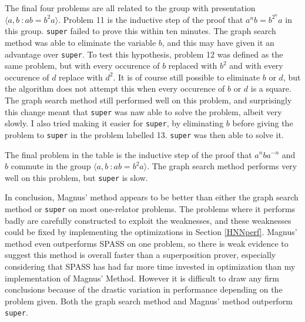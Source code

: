 \documentclass[12pt]{article} %
\theoremstyle{definition}
\theoremstyle{definition}
\theoremstyle{definition}
\theoremstyle{definition}
\begin{document}
The final four problems are all related to the group with presentation
$\langle a, b \ : ab = b^2a\rangle$. Problem 11 is the inductive step
of the proof that $a^nb = b^{2^n}a$ in this group. \lstinline{super} failed to prove this
within ten minutes. The graph search method was able to eliminate the variable
$b$, and this may have given it an advantage over \lstinline{super}.
To test this hypothesis, problem 12 was defined as
 the same problem, but with every occurence of $b$ replaced with $b^2$ and
with every occurence of $d$ replace with $d^2$. It is of course still possible
to eliminate $b$ or $d$, but the algorithm does not attempt this when every occurence of $b$ or $d$
is a square. The graph search method still performed well on this problem, and
surprisingly this change meant that \lstinline{super} was naw able to solve the problem, albeit
very slowly. I also tried making it easier for \lstinline{super}, by eliminating $b$ before giving the problem
to \lstinline{super} in the problem labelled 13. \lstinline{super} was then able to solve it.

The final problem in the table is the inductive step of the proof that
$a^nba^{-n}$ and $b$ commute in the group $\langle a, b \ : ab = b^2a\rangle$.
The graph search method performs very well on this problem, but \lstinline{super} is slow.

In conclusion, Magnus' method appears to be better than either the graph search method
or \lstinline{super} on most one-relator problems. The problems where it performs badly are
carefully constructed to exploit the weaknesses, and these weaknesses could be fixed
by implementing the optimizations in Section \ref{HNNperf}. Magnus' method even
outperforms SPASS on one problem, so there is weak evidence to suggest this method
is overall faster than a superposition prover, especially considering that SPASS
has had far more time invested in optimization than my implementation of Magnus'
Method. However it is difficult to draw any firm conclusions because of the drastic variation
in performance depending on the problem given. Both the graph
search method and Magnus' method outperform \lstinline{super}.


\end{document}
